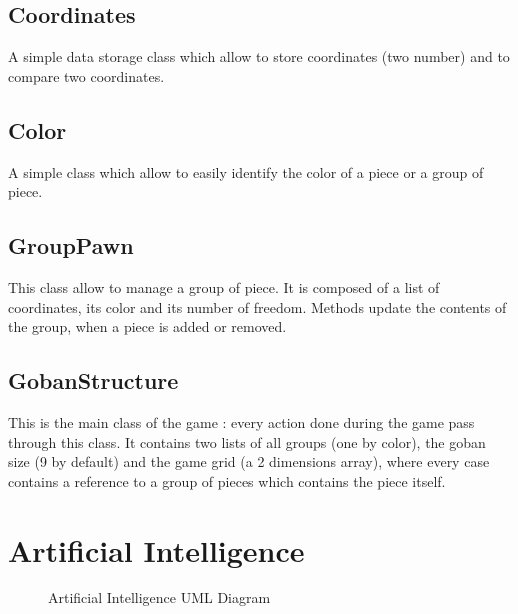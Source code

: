 \documentclass[12pt,a4paper,utf8x]{report}
\begin{document}
\begin{onehalfspace}
	\subsection{Coordinates}
			
		A simple data storage class which allow to store coordinates (two number) and to compare two coordinates.

	\subsection{Color}
		
		A simple class which allow to easily identify the color of a piece or a group of piece.
		
	\subsection{GroupPawn}
		
		This class allow to manage a group of piece. It is composed of a list of coordinates, its color and its number of freedom.
		Methods update the contents of the group, when a piece is added or removed.
		
	\subsection{GobanStructure}

		This is the main class of the game : every action done during the game pass through this class. It contains two lists of all groups (one by color), the goban size (9 by default) and the game grid (a 2 dimensions array), where every case contains a reference to a group of pieces which contains the piece itself.
		
	\section{Artificial Intelligence}

	\begin{figure}[!]
  		\begin{center}
  		\end{center}
  		\caption{Artificial Intelligence UML Diagram}
	\end{figure}


\end{onehalfspace}
\end{document}

